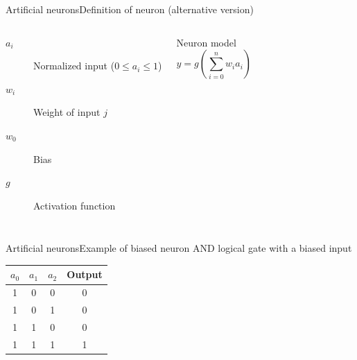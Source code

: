 \documentclass[10pt,compress]{beamer} %
\begin{document}
\begin{frame}{Artificial neurons}{Definition of neuron (alternative version)}
    

	\bigskip
    \begin{columns}
		\begin{description}
		\item[$a_i$] Normalized input ($0 \le a_i \le 1$)
		\item[$w_{i}$] Weight of input $j$
		\item[$w_0$] Bias
		\item[$g$] Activation function
		\end{description}

	   \begin{block}{Neuron model}
	   \vspace{-0.5cm}
	   \begin{equation*}
	   y=g\left( \sum_{i=0}^n w_{i} a_i \right)
	   \end{equation*}
	   \end{block}
    \end{columns}
\end{frame}

\begin{frame}{Artificial neurons}{Example of biased neuron}
	AND logical gate with a biased input

	\centering 

	\bigskip

	\centering \begin{tabular}{ccc|c}\hline
	$a_0$ & $a_1$ & $a_2$& Output\\\hline
	1    & 0     & 0     & 0\\
	1    & 0     & 1     & 0\\
	1    & 1     & 0     & 0\\
	1    & 1     & 1     & 1\\\hline
	\end{tabular}
\end{frame}
\end{document}
